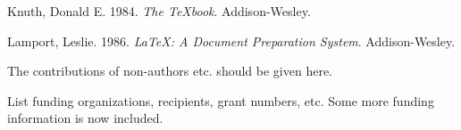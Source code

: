 \documentclass[
]{iucrjournals}
\newlength{\cslhangindent}
\newenvironment{CSLReferences}[2] %
 {\begin{list}{}{%
  \setlength{\itemindent}{0pt}
  \setlength{\leftmargin}{0pt}
  \setlength{\parsep}{0pt}
  \ifodd #1
   \setlength{\leftmargin}{\cslhangindent}
   \setlength{\itemindent}{-1\cslhangindent}
  \fi
  \setlength{\itemsep}{#2\baselineskip}}}
 {\end{list}}
\begin{document}
\label{refs}
\begin{CSLReferences}{1}{0}
Knuth, Donald E. 1984. \emph{The TeXbook}. Addison-Wesley.

Lamport, Leslie. 1986. \emph{{LaTeX}: A Document Preparation System}.
Addison-Wesley.

\end{CSLReferences}




\begin{acknowledgements}
The contributions of non-authors etc. should be given here.
\end{acknowledgements}

\begin{funding}
List funding organizations, recipients, grant numbers, etc. Some more
funding information is now included.
\end{funding}


\end{document}
